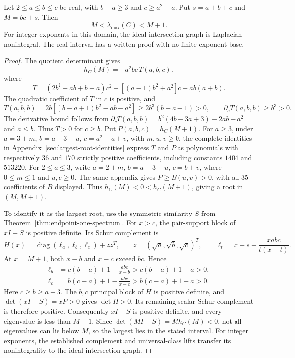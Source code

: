 \begin{theorem}
\label{thm:largest-root-unit-interval}
Let $2\leq a\leq b\leq c$ be real, with $b-a\geq3$ and $c\geq a^2-a$.
Put $s=a+b+c$ and $M=bc+s$. Then
\[
 M<\lambda_{\max}(C)<M+1.
\]
For integer exponents in this domain, the ideal intersection graph is
Laplacian nonintegral. The real interval has a written proof with no
finite exponent base.
\end{theorem}

\begin{proof}
The quotient determinant gives
\[
 h_C(M)=-a^2bc\,T(a,b,c),
\]
where
\[
 T=(2b^2-ab+b-a)c^2-[(a-1)b^2+a^2]c-ab(a+b).
\]
The quadratic coefficient of $T$ in $c$ is positive, and
\[
 T(a,b,b)=2b[(b-a+1)b^2-ab-a^2]\geq2b^3(b-a-1)>0,
 \qquad \partial_cT(a,b,b)\geq b^3>0.
\]
The derivative bound follows from
$\partial_cT(a,b,b)=b^2(4b-3a+3)-2ab-a^2$ and $a\leq b$.
Thus $T>0$ for $c\geq b$. Put $P(a,b,c)=h_C(M+1)$. For $a\geq3$, under
$a=3+m$, $b=a+3+u$, $c=a^2-a+v$, with $m,u,v\geq0$,
the complete identities in Appendix~\ref{sec:largest-root-identities}
express $T$ and $P$ as polynomials with respectively $36$ and $170$
strictly positive coefficients, including constants $1404$ and $513220$.
For $2\leq a\leq3$, write $a=2+m$, $b=a+3+u$, $c=b+v$,
where $0\leq m\leq1$ and $u,v\geq0$. The same appendix gives
$P\geq B(u,v)>0$, with all $35$ coefficients of $B$ displayed.
Thus $h_C(M)<0<h_C(M+1)$, giving a root in $(M,M+1)$.

To identify it as the largest root, use the symmetric similarity $S$
from Theorem~\ref{thm:endpoint-one-spectrum}. For $x>c$, the pair-support
block of $xI-S$ is positive definite. Its Schur complement is
\[
 H(x)=\operatorname{diag}(\ell_a,\ell_b,\ell_c)+zz^T,\qquad
 z=(\sqrt a,\sqrt b,\sqrt c)^T,\qquad
 \ell_t=x-s-\frac{xabc}{t(x-t)}.
\]
At $x=M+1$, both $x-b$ and $x-c$ exceed $bc$. Hence
\begin{align*}
 \ell_b&=c(b-a)+1-\frac{abc}{x-b}>c(b-a)+1-a>0,\\
 \ell_c&=b(c-a)+1-\frac{abc}{x-c}>b(c-a)+1-a>0.
\end{align*}
Here $c\geq b\geq a+3$. The $b,c$ principal block of $H$ is
positive definite, and $\det(xI-S)=xP>0$ gives $\det H>0$.
Its remaining scalar Schur complement is therefore positive.
Consequently $xI-S$ is positive definite, and every eigenvalue is less
than $M+1$. Since $\det(MI-S)=Mh_C(M)<0$, not all eigenvalues can
lie below $M$, so the largest lies in the stated interval. For integer exponents,
the established complement and universal-class lifts transfer its
nonintegrality to the ideal intersection graph.
\end{proof}

